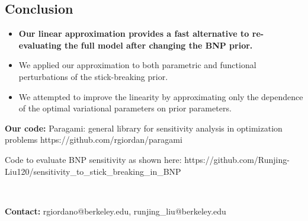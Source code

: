 \documentclass[a0,plainsections,30pt]{sciposter}\usepackage[]{graphicx}\usepackage[]{color}
\begin{document}
\begin{minipage}[t]{0.45\textwidth}
\begin{mdframed}[style=MyFrame]
\vspace{-0.6in}
\section*{Conclusion}
\vspace{-0.3in}

\begin{itemize}

\item {\bf Our linear approximation provides a fast alternative to re-evaluating the full model after changing the BNP prior. }

\item We applied our approximation to both parametric and functional perturbations of the stick-breaking prior.

\item We attempted to improve the linearity by approximating only the dependence of the optimal variational parameters on prior parameters.

\end{itemize}
\end{mdframed}

{\bf Our code: }\newline
Paragami: general library for sensitivity analysis in optimization problems\newline
{\color{blue} https://github.com/rgiordan/paragami}

Code to evaluate BNP sensitivity as shown here: \newline
{\color{blue} https://github.com/Runjing-Liu120/sensitivity\_to\_stick\_breaking\_in\_BNP}


\end{minipage}\\

\begin{center}

{\bf Contact: } rgiordano@berkeley.edu, runjing\_liu@berkeley.edu

\end{center}
\end{document}
